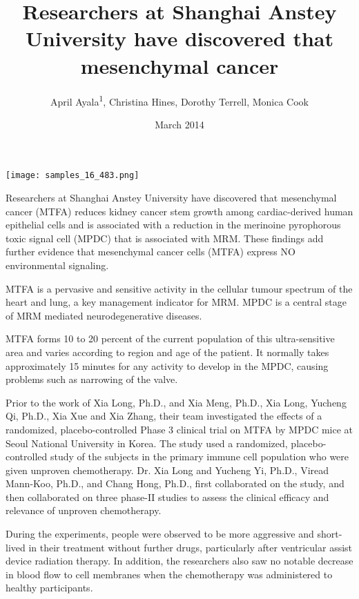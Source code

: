 \documentclass{article}
\title{Researchers at Shanghai Anstey University have discovered that mesenchymal cancer}
\author{April Ayala\textsuperscript{1},  Christina Hines,  Dorothy Terrell,  Monica Cook}
\affil{\textsuperscript{1}Chongqing Technology and Business University}
\date{March 2014}
\begin{document}
\maketitle

\begin{center}
\begin{minipage}{0.75\linewidth}
\texttt{[image: samples\_16\_483.png]}
\end{minipage}
\end{center}

Researchers at Shanghai Anstey University have discovered that mesenchymal cancer (MTFA) reduces kidney cancer stem growth among cardiac-derived human epithelial cells and is associated with a reduction in the merinoine pyrophorous toxic signal cell (MPDC) that is associated with MRM. These findings add further evidence that mesenchymal cancer cells (MTFA) express NO environmental signaling.

MTFA is a pervasive and sensitive activity in the cellular tumour spectrum of the heart and lung, a key management indicator for MRM. MPDC is a central stage of MRM mediated neurodegenerative diseases.

MTFA forms 10 to 20 percent of the current population of this ultra-sensitive area and varies according to region and age of the patient. It normally takes approximately 15 minutes for any activity to develop in the MPDC, causing problems such as narrowing of the valve.

Prior to the work of Xia Long, Ph.D., and Xia Meng, Ph.D., Xia Long, Yucheng Qi, Ph.D., Xia Xue and Xia Zhang, their team investigated the effects of a randomized, placebo-controlled Phase 3 clinical trial on MTFA by MPDC mice at Seoul National University in Korea. The study used a randomized, placebo-controlled study of the subjects in the primary immune cell population who were given unproven chemotherapy. Dr. Xia Long and Yucheng Yi, Ph.D., Viread Mann-Koo, Ph.D., and Chang Hong, Ph.D., first collaborated on the study, and then collaborated on three phase-II studies to assess the clinical efficacy and relevance of unproven chemotherapy.

During the experiments, people were observed to be more aggressive and short-lived in their treatment without further drugs, particularly after ventricular assist device radiation therapy. In addition, the researchers also saw no notable decrease in blood flow to cell membranes when the chemotherapy was administered to healthy participants.
\end{document}
